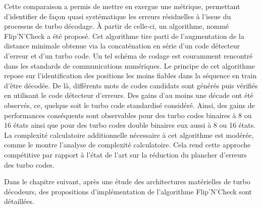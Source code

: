 Cette comparaison a permis de mettre en exergue une métrique, permettant d'identifier de façon quasi systématique
les erreurs résiduelles à l'issue du processus de turbo décodage. À partir de celle-ci, un algorithme, nommé Flip'N'Check
a été proposé. Cet algorithme tire parti de l'augmentation de la distance minimale obtenue via la concaténation en série 
d'un code détecteur d'erreur et d'un turbo code. Un tel schéma de codage est couramment rencontré dans les standards de 
communications numériques. Le principe de cet algorithme repose sur l'identification des positions les moins fiables dans la séquence en train 
d'être décodée. De là, différents mots de codes candidats sont générés puis vérifiés en utilisant le code détecteur d'erreurs.
Des gains d'au moins une décade ont été observés, ce, quelque soit le turbo code standardisé considéré. Ainsi, des gains
de performances conséquents sont observables pour des turbo codes binaires à 8 ou 16 états ainsi que pour des turbo codes 
double binaires eux aussi à 8 ou 16 états. La complexité calculatoire additionnelle nécessaire à cet algorithme est modérée,
comme le montre l'analyse de complexité calculatoire.
Cela rend cette approche compétitive par rapport à l’état de l'art sur la réduction du plancher d'erreurs des turbo codes.

Dans le chapitre suivant, après une étude des architectures matérielles de turbo décodeurs, des propositions d'implémentation 
de l'algorithme Flip'N'Check sont détaillées.



